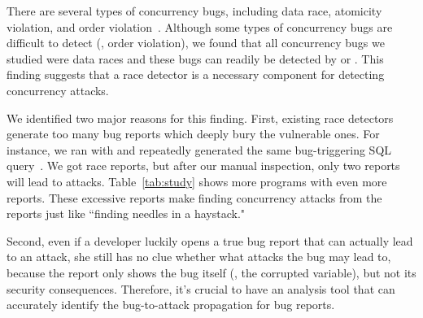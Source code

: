 
 There are several types of concurrency bugs,
including data race, atomicity violation, 
and order violation~\cite{lu:concurrency-bugs}. Although some types of 
concurrency bugs are difficult to detect (\eg, order violation), we found that 
all concurrency bugs we studied were data races and these bugs can readily be 
detected by \tsan or \ski. This finding suggests that a race detector 
is a necessary component for detecting concurrency attacks.



 We identified two major reasons for this finding. 
First, existing race detectors generate too many bug reports which deeply bury 
the vulnerable ones. For instance, we ran \mysql with \tsan and repeatedly 
generated the same bug-triggering SQL query~\cite{mysql-bug-24988}. We got 
\nmysqlDetectedSameReq race reports, but after our manual inspection, only two 
reports will lead to attacks. Table~\ref{tab:study} shows 
more programs with even more reports. These excessive reports make 
finding concurrency attacks from the reports just like ``finding needles in a 
haystack."

Second, even if a developer luckily opens a true bug report that can actually 
lead to an attack, she still has no clue whether what attacks the bug may lead 
to, because the report only shows the bug itself (\eg, the corrupted variable), 
but not its security consequences. Therefore, it's crucial to have an analysis 
tool that can accurately identify the bug-to-attack propagation for bug reports.

